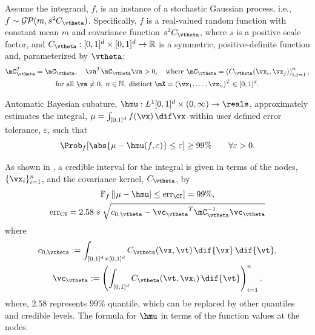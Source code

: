 Assume the integrand, $f$, is an instance of a stochastic Gaussian process, i.e., $f \sim \mathcal{GP}(m,s^2 C_{\vtheta})$.  Specifically, $f$ is a real-valued random function with constant mean $m$ and covariance function $s^2C_{\vtheta}$, where $s$ is a positive scale factor, and $C_{\vtheta}: [0,1]^d \times [0,1]^d \to \mathbb{R} $ is a symmetric, positive-definite function and, parameterized by $\vtheta$:
\begin{multline} \label{FJH:eq:CondPosDef}
\mC_{\vtheta}^T = \mC_{\vtheta},  \quad {\va^T} \mC_{\vtheta} {\va} > 0, \quad \text{where }  \mC_{\vtheta} = \left(  C_{\vtheta}({\vx}_i,{\vx}_j)  \right)_{i,j=1}^n, \\
\text{for all } {\va} \ne 0, \;
n\in \mathbb{N}, \; \text{distinct} \; \mX = ({\vx}_1, \ldots, {\vx}_n)^T \in [0,1]^d.
\end{multline}

Automatic Bayesian cubature, $\hmu: L^1[0,1]^d \times (0,\infty) \to \reals$, approximately estimates the integral, $\mu = \int_{[0,1]^d} f(\vx) \, \dif \vx$ within user defined error tolerance, $\varepsilon$, 
 such that 
\[
{\Prob_f  [ }\abs{ \mu - \hmu(f,\varepsilon)} \le \varepsilon 
{ ] \ge 99\%} \qquad \forall \varepsilon > 0.
\]

As shown in \cite{RatHic19a}, a credible interval for the integral is given in terms of the nodes, $\{\vx_i\}_{i=1}^n$, and the covariance kernel, $C_{\vtheta}$,  by 
\begin{subequations} \label{eqn_prob_confidence_interval}
\begin{gather}
\mathbb{P}_f \left[
|\mu-\hmu| \leq \text{err}_\CI
\right] = 99\%, \\
{\text{err}_{\text{CI}}} = 2.58 \; s \; \sqrt{c_{0,{\vtheta}} - {\vc_{\vtheta}}^T \mC_{\vtheta}^{-1}\vc_{\vtheta}}
\end{gather}
\end{subequations}
where
\begin{subequations} \label{eqn:fGaussDist}
\begin{gather}
\label{eqn:fGaussDist_c0}
	c_{0,{\vtheta}} := \int_{[0,1]^{d} \times [0,1]^{d}} C_{\vtheta} (\vx,\vt) \, \dif{\vx} \, \dif{\vt}, \\
	\label{eqn:fGaussDist_vc}
 \vc_{\vtheta} := \left(  \int_{[0,1]^d} C_{\vtheta} (\vt,\vx_i) \, \dif{\vt} \right)_{i=1}^n.
	\end{gather}
\end{subequations}
where, $2.58$ represents $99\%$ quantile, which can be replaced by other quantiles and credible levels.  The formula for $\hmu$ in terms of the function values at the nodes. %

